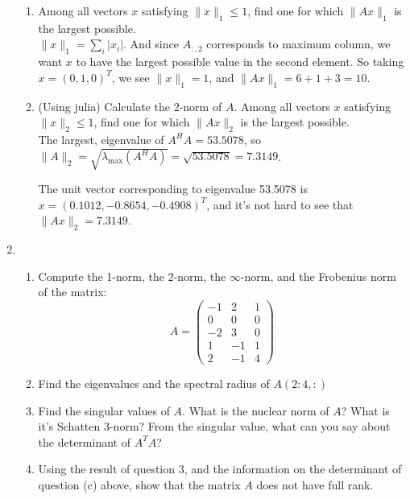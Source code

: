 \documentclass[11pt]{article}
\newcommand{\n}{\vspace{0.2cm}}
\begin{document}
\begin{enumerate}
\begin{enumerate}[label=(\alph*)]
		      \item Among all vectors \(x\) satisfying \(\lVert x \rVert_1 \leq 1\), find one for which \(\lVert Ax \rVert_1\) is the largest possible. \n\\
		            \(\lVert x \rVert_1 = \sum_{i} |x_i|\).  And since \(A_{:,2}\) corresponds to maximum column, we want \(x\) to have the largest possible value in the second element.  So taking \(x = (0,1,0)^T\), we see \(\lVert x \rVert_1 = 1\), and \(\lVert Ax \rVert_1 = 6 + 1 + 3 = 10\).

		      \item (Using julia) Calculate the 2-norm of \(A\).  Among all vectors \(x\) satisfying \(\lVert x \rVert_2 \leq 1\), find one for which \(\lVert Ax \rVert_2\) is the largest possible. \n\\
		            The largest, eigenvalue of \(A^HA = 53.5078\), so \(\lVert A \rVert_2 = \sqrt{\lambda_{\text{max}}(A^HA)} = \sqrt{53.5078} = 7.3149\). \n

		            The unit vector corresponding to eigenvalue 53.5078 is \(x = (0.1012, -0.8654, -0.4908)^T\), and it's not hard to see that \(\lVert Ax \rVert_2 = 7.3149\).
	      \end{enumerate}

	\item \begin{enumerate}[label=(\alph*)]
		      \item Compute the 1-norm, the 2-norm, the \(\infty\)-norm, and the Frobenius norm of the matrix:
		            \[A = \begin{pmatrix} -1 & 2 & 1 \\ 0 & 0 & 0 \\ -2 & 3 & 0 \\ 1 & -1 & 1 \\ 2 & -1 & 4 \end{pmatrix}\]
		      \item Find the eigenvalues and the spectral radius of \(A(2:4,:)\)
		      \item Find the singular values of \(A\).  What is the nuclear norm of \(A\)?  What is it's Schatten 3-norm?  From the singular value, what can you say about the determinant of \(A^TA\)?
		      \item Using the result of question 3, and the information on the determinant of question (c) above, show that the matrix \(A\) does not have full rank.
	      \end{enumerate}
\end{enumerate}
\end{document}
